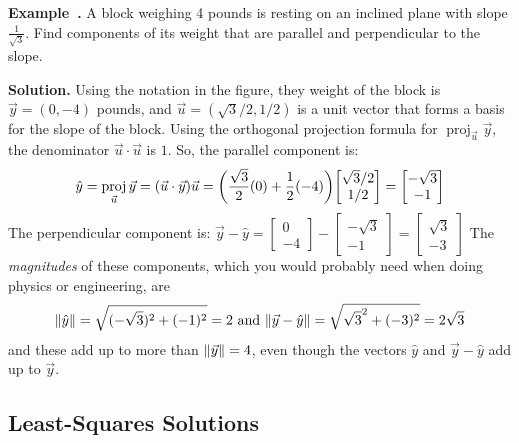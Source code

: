 \documentclass[11pt, letterpaper]{report}
\newenvironment{notes}{}{}
\newenvironment{book}{}{}
\let\originalleft\left
\let\originalright\right
\renewcommand{\left}{\mathopen{}\mathclose\bgroup\originalleft}
\renewcommand{\right}{\aftergroup\egroup\originalright}
\newcounter{example}[section]
\newcommand{\example}{\refstepcounter{example}%
\par\noindent\textbf{Example~\theexample.} }
\DeclareMathOperator{\proj}{proj}
\newcommand{\bbvec}[2]{
  \begin{bmatrix} #1 \\ #2 \end{bmatrix}
}
\newcommand\nm[1]{\left\lVert #1 \right\rVert}
\begin{document}
\example A block weighing 4 pounds is resting on an inclined plane with slope $\frac{1}{\sqrt{3}}$. Find components of its weight that are parallel and perpendicular to the slope.


\hfill{}

\begin{notes}
\vfill
\end{notes}

\begin{book}
\textbf{Solution.} Using the notation in the figure, they weight of the block is $\vec{y} = (0,-4)$ pounds, and $\vec{u}=( \sqrt{3}/2, 1/2 )$ is a unit vector that forms a basis for the slope of the block. Using the orthogonal projection formula for $\proj_{\vec{u}}\vec{y}$, the denominator $\vec{u}\cdot \vec{u}$ is $1$. So, the parallel component is:
\[\hat{y} = \proj_{\vec{u}}\vec{y} = (\vec{u}\cdot \vec{y})\vec{u} = \left(\frac{\sqrt{3}}{2}(0)+\frac{1}{2}(-4)\right)\bbvec{\sqrt{3}/2}{1/2} = \bbvec{-\sqrt{3}}{-1}  \]
The perpendicular component is:
$\vec{y}-\hat{y} = \bbvec{0}{-4}- \bbvec{-\sqrt{3}}{-1} = \bbvec{\sqrt{3}}{-3}$
The \emph{magnitudes} of these components, which you would probably need when doing physics or engineering, are
\[\nm{\hat{y}} = \sqrt{(-\sqrt{3})^2+(-1)^2} = 2 \text{ and } \nm{\vec{y}-\hat{y}} = \sqrt{\sqrt{3}^2+(-3)^2} = 2\sqrt{3}\]
and these add up to more than $\nm{\vec{y}} = 4$, even though the vectors $\hat{y}$ and $\vec{y}-\hat{y}$ add up to $\vec{y}$. \blacksquare
\end{book}

\subsection{Least-Squares Solutions} \label{subsec:least-squares-solutions} 
\end{document}
